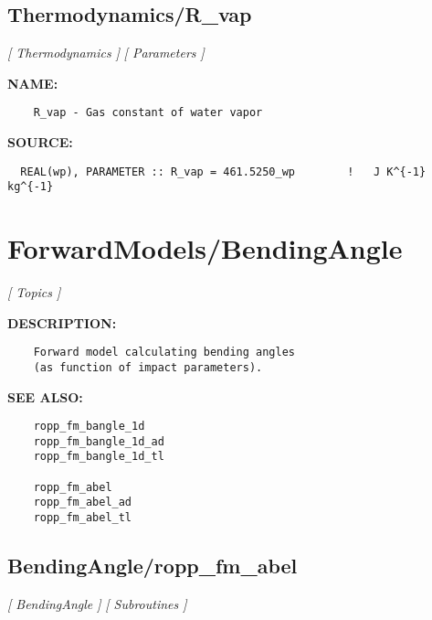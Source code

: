 \subsection{Thermodynamics/R\_vap}
\textsl{[ Thermodynamics ]}
\textsl{[ Parameters ]}

\label{ch:robo86}
\label{ch:Thermodynamics_R_vap}
\textbf{NAME:}\hspace{0.08in}\begin{Verbatim}
    R_vap - Gas constant of water vapor
\end{Verbatim}
\textbf{SOURCE:}\hspace{0.08in}\begin{Verbatim}
  REAL(wp), PARAMETER :: R_vap = 461.5250_wp        !   J K^{-1} kg^{-1}
\end{Verbatim}
\section{ForwardModels/BendingAngle}
\textsl{[ Topics ]}

\label{ch:robo41}
\label{ch:ForwardModels_BendingAngle}
\textbf{DESCRIPTION:}\hspace{0.08in}\begin{Verbatim}
    Forward model calculating bending angles
    (as function of impact parameters).
\end{Verbatim}
\textbf{SEE ALSO:}\hspace{0.08in}\begin{Verbatim}
    ropp_fm_bangle_1d
    ropp_fm_bangle_1d_ad
    ropp_fm_bangle_1d_tl

    ropp_fm_abel
    ropp_fm_abel_ad
    ropp_fm_abel_tl
\end{Verbatim}
\subsection{BendingAngle/ropp\_fm\_abel}
\textsl{[ BendingAngle ]}
\textsl{[ Subroutines ]}

